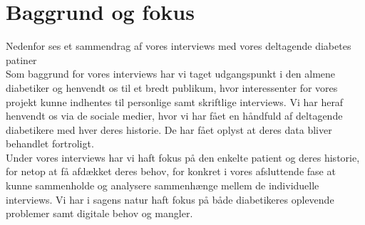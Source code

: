 \section{Baggrund og fokus}
Nedenfor ses et sammendrag af vores interviews med vores deltagende diabetes patiner\\
Som baggrund for vores interviews har vi taget udgangspunkt i den almene diabetiker og henvendt os til et bredt publikum, hvor interessenter for vores projekt kunne indhentes til personlige samt skriftlige interviews. Vi har heraf henvendt os via de sociale medier, hvor vi har fået en håndfuld af deltagende diabetikere med hver deres historie. De har fået oplyst at deres data bliver behandlet fortroligt.\\
Under vores interviews har vi haft fokus på den enkelte patient og deres historie, for netop at få afdækket deres behov, for konkret i vores afsluttende fase at kunne sammenholde og analysere sammenhænge mellem de individuelle interviews. Vi har i sagens natur haft fokus på både diabetikeres oplevende problemer samt digitale behov og mangler.



